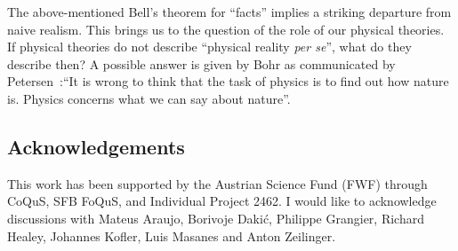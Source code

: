 \documentclass[12pt]{article}
\begin{document}
The above-mentioned Bell's theorem for ``facts'' implies a striking departure from naive realism. This brings us to the question of the role of our physical theories. If physical theories do not describe ``physical reality {\it per se}'', what do they describe then? A possible answer is given by Bohr as communicated by Petersen~\cite{bohr}:``It is wrong to think that the task of physics is to find out how nature is. Physics concerns what we can say about nature''.

\subsection*{Acknowledgements}
This work has been supported by the Austrian Science Fund (FWF) through CoQuS, SFB FoQuS, and Individual Project 2462. I would like to acknowledge discussions with Mateus Araujo, Borivoje Daki{\'c}, Philippe Grangier, Richard Healey, Johannes Kofler, Luis Masanes and Anton Zeilinger.
\end{document}
